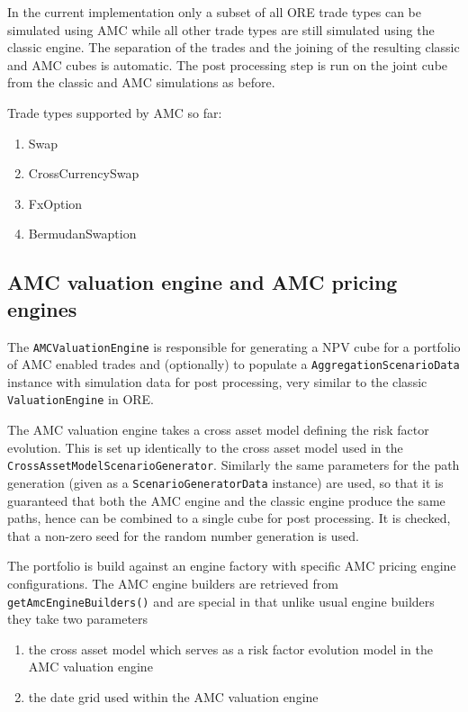 In the current implementation only a subset of all ORE trade types can be simulated using AMC while all other trade types
are still simulated using the classic engine. The separation of the trades and the joining of the resulting classic and AMC
cubes is automatic. The post processing step is run on the joint cube from the classic and AMC simulations as before.

Trade types supported by AMC so far:
\begin{enumerate}
\item Swap
\item CrossCurrencySwap
\item FxOption
\item BermudanSwaption
\end{enumerate}


\subsection{AMC valuation engine and AMC pricing engines}

The \verb+AMCValuationEngine+ is responsible for generating a NPV cube for a portfolio of AMC enabled trades and
(optionally) to populate a \verb+AggregationScenarioData+ instance with simulation data for post processing, very
similar to the classic \verb+ValuationEngine+ in ORE.

The AMC valuation engine takes a cross asset model defining the risk factor evolution. This is set up identically to the
cross asset model used in the \\ \verb+CrossAssetModelScenarioGenerator+. Similarly the same parameters for the path
generation (given as a \verb+ScenarioGeneratorData+ instance) are used, so that it is guaranteed that both the AMC
engine and the classic engine produce the same paths, hence can be combined to a single cube for post processing. It is
checked, that a non-zero seed for the random number generation is used.

The portfolio is build against an engine factory with specific AMC pricing engine configurations.
The AMC engine builders are retrieved from \verb+getAmcEngineBuilders()+ and are special in that unlike usual
engine builders they take two parameters

\begin{enumerate}
\item the cross asset model which serves as a risk factor evolution model in the AMC valuation engine
\item the date grid used within the AMC valuation engine
\end{enumerate}

